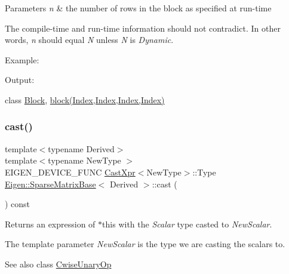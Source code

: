 \begin{DoxyParams}{Parameters}
{\em n} & the number of rows in the block as specified at run-\/time\\
\hline
\end{DoxyParams}
The compile-\/time and run-\/time information should not contradict. In other words, {\itshape n} should equal {\itshape N} unless {\itshape N} is {\itshape Dynamic}.

Example\+: 
\begin{DoxyCodeInclude}{0}
\end{DoxyCodeInclude}
 Output\+: 
\begin{DoxyVerbInclude}
\end{DoxyVerbInclude}
 class \mbox{\hyperlink{class_eigen_1_1_block}{Block}}, \mbox{\hyperlink{class_eigen_1_1_sparse_matrix_base_a7c28a2f511181c727396d5e813519d38}{block(\+Index,\+Index,\+Index,\+Index)}} \mbox{\label{class_eigen_1_1_sparse_matrix_base_a0a096b9ebe064a3d55a124da2e3ee008}} 
\subsubsection{\texorpdfstring{cast()}{cast()}}
{\footnotesize\ttfamily template$<$typename Derived$>$ \\
template$<$typename New\+Type $>$ \\
E\+I\+G\+E\+N\+\_\+\+D\+E\+V\+I\+C\+E\+\_\+\+F\+U\+NC \mbox{\hyperlink{struct_eigen_1_1_sparse_matrix_base_1_1_cast_xpr}{Cast\+Xpr}}$<$New\+Type$>$\+::Type \mbox{\hyperlink{class_eigen_1_1_sparse_matrix_base}{Eigen\+::\+Sparse\+Matrix\+Base}}$<$ Derived $>$\+::cast (\begin{DoxyParamCaption}{ }\end{DoxyParamCaption}) const\hspace{0.3cm}{\ttfamily [inline]}}

\begin{DoxyReturn}{Returns}
an expression of {\ttfamily $\ast$this} with the {\itshape Scalar} type casted to {\itshape New\+Scalar}.
\end{DoxyReturn}
The template parameter {\itshape New\+Scalar} is the type we are casting the scalars to.\begin{DoxySeeAlso}{See also}
class \mbox{\hyperlink{class_eigen_1_1_cwise_unary_op}{Cwise\+Unary\+Op}} 
\end{DoxySeeAlso}
\mbox{\label{class_eigen_1_1_sparse_matrix_base_a8f4eaa3c3921ef3823ffc69ebcc356af}} 
